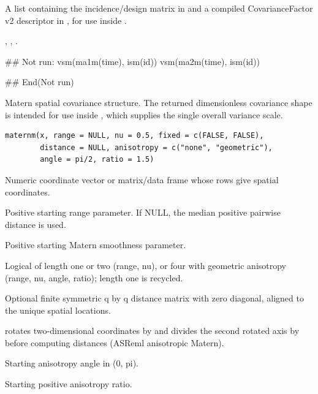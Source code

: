 \documentclass[a4paper]{book}
\begin{document}
%
\begin{Value}
A list containing the incidence/design matrix in  and a compiled CovarianceFactor v2 descriptor in , for use inside .
\end{Value}
%
\begin{SeeAlso}\relax
{}, , .
\end{SeeAlso}
%
\begin{Examples}
\begin{ExampleCode}
## Not run: 
vsm(ma1m(time), ism(id))
vsm(ma2m(time), ism(id))

## End(Not run)
\end{ExampleCode}
\end{Examples}
%
\begin{Description}\relax
Matern spatial covariance structure. The returned dimensionless covariance shape is intended for use inside , which supplies the single overall variance scale.
\end{Description}
%
\begin{Usage}
\begin{verbatim}
maternm(x, range = NULL, nu = 0.5, fixed = c(FALSE, FALSE),
        distance = NULL, anisotropy = c("none", "geometric"),
        angle = pi/2, ratio = 1.5)
\end{verbatim}
\end{Usage}
%
\begin{Arguments}
\begin{ldescription}
\item[\code{x}] Numeric coordinate vector or matrix/data frame whose rows give spatial coordinates.
\item[\code{range}] Positive starting range parameter.  If NULL, the median positive pairwise distance is used.
\item[\code{nu}] Positive starting Matern smoothness parameter.
\item[\code{fixed}] Logical of length one or two (range, nu), or four with geometric anisotropy (range, nu, angle, ratio); length one is recycled.
\item[\code{distance}] Optional finite symmetric q by q distance matrix with zero diagonal, aligned to the unique spatial locations.
\item[\code{anisotropy}]  rotates two-dimensional coordinates by  and divides the second rotated axis by  before computing distances (ASReml anisotropic Matern).
\item[\code{angle}] Starting anisotropy angle in (0, pi).
\item[\code{ratio}] Starting positive anisotropy ratio.
\end{ldescription}
\end{Arguments}
\end{document}
